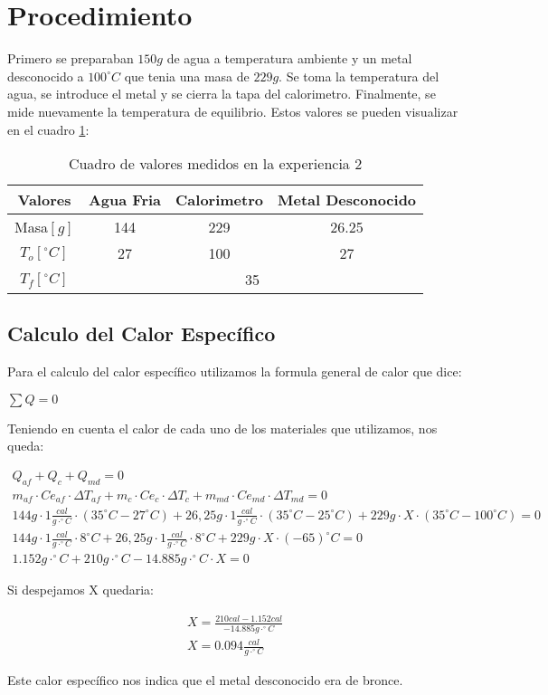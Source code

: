 \documentclass[12pt]{report}
\begin{document}
\section{Procedimiento}
Primero se preparaban $150 g$ de agua a temperatura ambiente y un metal desconocido a $100^\circ C$ que tenia una masa de $229 g$. Se toma la temperatura del agua, se introduce el metal y se cierra la tapa del calorimetro. Finalmente, se mide nuevamente la temperatura de equilibrio.
Estos valores se pueden visualizar en el cuadro \ref{table:data}:

\begin{table}[h!]
\centering
\begin{tabular}{|c|c|c|c|}
    \hline
    Valores & Agua Fria & Calorimetro & Metal Desconocido \\
    \hline
    Masa$[g]$ & 144 & 229 & 26.25 \\
    \hline
    $T_o [^\circ C]$ & 27 & 100 & 27 \\
    \hline
    $T_f [^\circ C]$ & \multicolumn{3}{|c|}{35}\\
    \hline
\end{tabular}
\caption{Cuadro de valores medidos en la experiencia 2}
\label{table:data}
\end{table}

\subsection{Calculo del Calor Específico}

Para el calculo del calor específico utilizamos la formula general de calor que dice:

\begin{center}
\begin{math}
\sum Q = 0
\end{math}
\end{center}

\noindent
Teniendo en cuenta el calor de cada uno de los materiales que utilizamos, nos queda:

\tiny{
\begin{eqnarray*}
Q_{af} + Q_c + Q_{md} = 0 \\
m_{af} \cdot Ce_{af} \cdot \Delta T_{af} + m_c \cdot Ce_c \cdot \Delta T_c + m_{md} \cdot Ce_{md} \cdot \Delta T_{md} = 0 \\
144g \cdot 1 \frac{cal}{g\cdot^\circ C} \cdot (35^\circ C - 27^\circ C) + 26,25g \cdot 1 \frac{cal}{g\cdot^\circ C} \cdot (35^\circ C - 25^\circ C) + 229g \cdot X \cdot (35^\circ C - 100^\circ C) = 0 \\
144g \cdot 1 \frac{cal}{g\cdot^\circ C} \cdot 8^\circ C + 26,25g \cdot 1 \frac{cal}{g\cdot^\circ C} \cdot 8^\circ C + 229g \cdot X \cdot (-65)^\circ C = 0 \\
1.152 g\cdot^\circ C + 210 g\cdot^\circ C - 14.885 g\cdot^\circ C \cdot X = 0
\end{eqnarray*}
}

\normalsize{
\noindent
Si despejamos X quedaria:

\begin{eqnarray*}
X = \frac{210 cal - 1.152 cal}{-14.885 g\cdot^\circ C}\\
X = 0.094 \frac{cal}{g\cdot^\circ C}
\end{eqnarray*}

\noindent
Este calor específico nos indica que el metal desconocido era de bronce.
}
\end{document}
